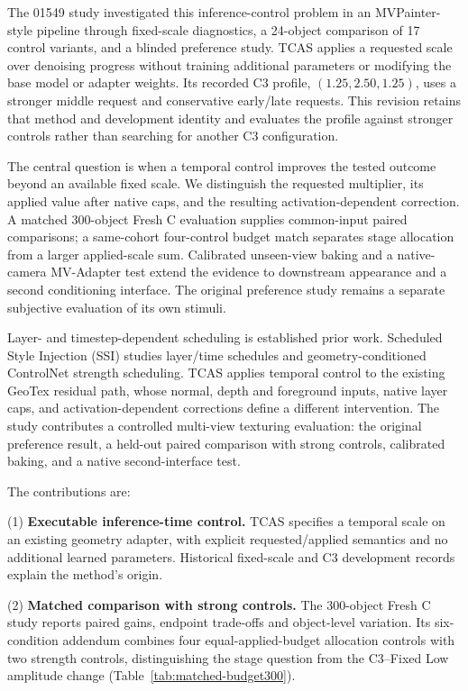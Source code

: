 \documentclass[times,twocolumn,final]{elsarticle}
\begin{document}
The 01549 study investigated this inference-control problem in an MVPainter-style pipeline through fixed-scale diagnostics, a 24-object comparison of 17 control variants, and a blinded preference study. TCAS applies a requested scale over denoising progress without training additional parameters or modifying the base model or adapter weights. Its recorded C3 profile, $(1.25,2.50,1.25)$, uses a stronger middle request and conservative early/late requests. This revision retains that method and development identity and evaluates the profile against stronger controls rather than searching for another C3 configuration.

The central question is when a temporal control improves the tested outcome beyond an available fixed scale. We distinguish the requested multiplier, its applied value after native caps, and the resulting activation-dependent correction. A matched 300-object Fresh C evaluation supplies common-input paired comparisons; a same-cohort four-control budget match separates stage allocation from a larger applied-scale sum. Calibrated unseen-view baking and a native-camera MV-Adapter test extend the evidence to downstream appearance and a second conditioning interface. The original preference study remains a separate subjective evaluation of its own stimuli.

Layer- and timestep-dependent scheduling is established prior work. Scheduled Style Injection (SSI) studies layer/time schedules and geometry-conditioned ControlNet strength scheduling. TCAS applies temporal control to the existing GeoTex residual path, whose normal, depth and foreground inputs, native layer caps, and activation-dependent corrections define a different intervention. The study contributes a controlled multi-view texturing evaluation: the original preference result, a held-out paired comparison with strong controls, calibrated baking, and a native second-interface test.

The contributions are:

(1) \textbf{Executable inference-time control.} TCAS specifies a temporal scale on an existing geometry adapter, with explicit requested/applied semantics and no additional learned parameters. Historical fixed-scale and C3 development records explain the method's origin.

(2) \textbf{Matched comparison with strong controls.} The 300-object Fresh C study reports paired gains, endpoint trade-offs and object-level variation. Its six-condition addendum combines four equal-applied-budget allocation controls with two strength controls, distinguishing the stage question from the C3--Fixed Low amplitude change (Table~\ref{tab:matched-budget300}).
\end{document}
